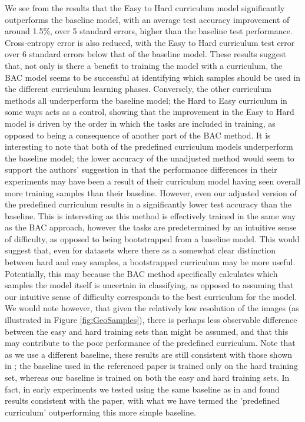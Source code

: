 We see from the results that the Easy to Hard curriculum model significantly outperforms the baseline model, with an average test accuracy improvement of around 1.5\%, over 5 standard errors, higher than the baseline test performance.  Cross-entropy error is also reduced, with the Easy to Hard curriculum test error over 6 standard errors below that of the baseline model. These results suggest that, not only is there a benefit to training the model with a curriculum, the BAC model seems to be successful at identifying which samples should be used in the different curriculum learning phases. Conversely, the other curriculum methods all underperform the baseline model; the Hard to Easy curriculum in some ways acts as a control, showing that the improvement in the Easy to Hard model is driven by the order in which the tasks are included in training, as opposed to being a consequence of another part of the BAC method. It is interesting to note that both of the predefined curriculum models underperform the baseline model; the lower accuracy of the unadjusted method would seem to support the authors' suggestion in  \cite{Bengio2009} that the performance differences in their experiments may have been a result of their curriculum model having seen overall more training samples than their baseline. However, even our adjusted version of the predefined curriculum results in a significantly lower test accuracy than the baseline. This is interesting as this method is effectively trained in the same way as the BAC approach, however the tasks are predetermined by an intuitive sense of difficulty, as opposed to being bootstrapped from a baseline model. This would suggest that, even for datasets where there as a somewhat clear distinction between hard and easy samples, a bootstrapped curriculum may be more useful. Potentially, this may because the BAC method specifically calculates which samples the model itself is uncertain in classifying, as opposed to assuming that our intuitive sense of difficulty corresponds to the best curriculum for the model. We would note however, that given the relatively low resolution of the images (as illustrated in Figure \ref{fig:GeoSamples}), there is perhaps less observable difference between the easy and hard training sets than might be assumed, and that this may contribute to the poor performance of the predefined curriculum. Note that as we use a different baseline, these results are still consistent with those shown in \cite{Bengio2009}; the baseline used in the referenced paper is trained only on the hard training set, whereas our baseline is trained on both the easy and hard training sets. In fact, in early experiments we tested using the same baseline as in \cite{Bengio2009} and found results consistent with the paper, with what we have termed the 'predefined curriculum' outperforming this more simple baseline.

